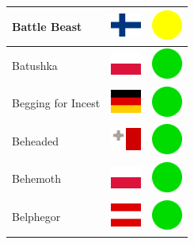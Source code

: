 \documentclass[12pt, a4paper, twoside]{report}
\begin{document}
\begin{center}
\begin{longtable}{|p{5cm}|p{2cm}|p{2cm}|}
Battle Beast & \includegraphics[width=1cm]{4x3/fi} & \includegraphics[width=1cm]{likes/m} \\ \hline
Batushka & \includegraphics[width=1cm]{4x3/pl} & \includegraphics[width=1cm]{likes/y} \\ \hline
Begging for Incest & \includegraphics[width=1cm]{4x3/de} & \includegraphics[width=1cm]{likes/y} \\ \hline
Beheaded & \includegraphics[width=1cm]{4x3/mt} & \includegraphics[width=1cm]{likes/y} \\ \hline
Behemoth & \includegraphics[width=1cm]{4x3/pl} & \includegraphics[width=1cm]{likes/y} \\ \hline
Belphegor & \includegraphics[width=1cm]{4x3/at} & \includegraphics[width=1cm]{likes/y} \\ \hline

\end{longtable}
\end{center}
\end{document}
